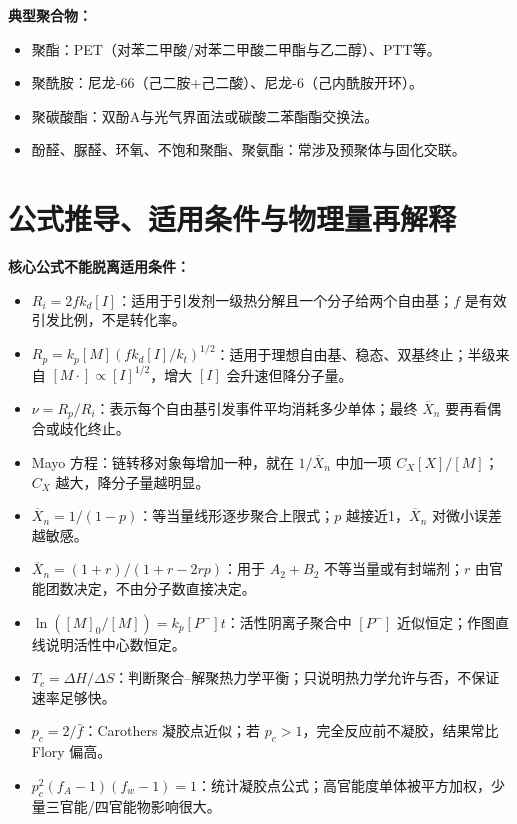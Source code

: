 \documentclass[UTF8,a4paper,10pt,twocolumn]{ctexart}
\newcommand{\Xn}{\overline{X}_n}
\newcommand{\kp}{k_p}
\newcommand{\kt}{k_t}
\newcommand{\kd}{k_d}
\newcommand{\Rp}{R_p}
\newcommand{\Ri}{R_i}
\begin{document}
\textbf{典型聚合物：}
\begin{itemize}
  \item 聚酯：PET（对苯二甲酸/对苯二甲酸二甲酯与乙二醇）、PTT等。
  \item 聚酰胺：尼龙-66（己二胺+己二酸）、尼龙-6（己内酰胺开环）。
  \item 聚碳酸酯：双酚A与光气界面法或碳酸二苯酯酯交换法。
  \item 酚醛、脲醛、环氧、不饱和聚酯、聚氨酯：常涉及预聚体与固化交联。
\end{itemize}



\section{公式推导、适用条件与物理量再解释}
\begin{exam}
  \textbf{核心公式不能脱离适用条件：}
  \begin{itemize}
    \item $\Ri=2f\kd[I]$：适用于引发剂一级热分解且一个分子给两个自由基；$f$ 是有效引发比例，不是转化率。
    \item $\Rp=\kp[M](f\kd[I]/\kt)^{1/2}$：适用于理想自由基、稳态、双基终止；半级来自 $[M\cdot]\propto[I]^{1/2}$，增大 $[I]$ 会升速但降分子量。
    \item $\nu=\Rp/\Ri$：表示每个自由基引发事件平均消耗多少单体；最终 $\Xn$ 要再看偶合或歧化终止。
    \item Mayo 方程：链转移对象每增加一种，就在 $1/\Xn$ 中加一项 $C_X[X]/[M]$；$C_X$ 越大，降分子量越明显。
    \item $\Xn=1/(1-p)$：等当量线形逐步聚合上限式；$p$ 越接近1，$\Xn$ 对微小误差越敏感。
    \item $\Xn=(1+r)/(1+r-2rp)$：用于 $A_2+B_2$ 不等当量或有封端剂；$r$ 由官能团数决定，不由分子数直接决定。
    \item $\ln([M]_0/[M])=k_p[P^-]t$：活性阴离子聚合中 $[P^-]$ 近似恒定；作图直线说明活性中心数恒定。
    \item $T_c=\Delta H/\Delta S$：判断聚合--解聚热力学平衡；只说明热力学允许与否，不保证速率足够快。
    \item $p_c=2/\bar f$：Carothers 凝胶点近似；若 $p_c>1$，完全反应前不凝胶，结果常比 Flory 偏高。
    \item $p_c^2(f_A-1)(f_w-1)=1$：统计凝胶点公式；高官能度单体被平方加权，少量三官能/四官能物影响很大。
  \end{itemize}
\end{exam}
\end{document}
